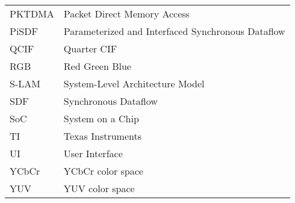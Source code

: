 \begin{longtable}{@{}p{}p{}@{}}
    PKTDMA & Packet Direct Memory Access \\
    PiSDF & Parameterized and Interfaced Synchronous Dataflow \\
    QCIF & Quarter CIF \\
    RGB & Red Green Blue \\
    S-LAM & System-Level Architecture Model \\
    SDF & Synchronous Dataflow \\
    SoC & System on a Chip \\
    TI & Texas Instruments \\
    UI & User Interface \\
    YCbCr & YCbCr color space \\
    YUV & YUV color space \\
\end{longtable}
